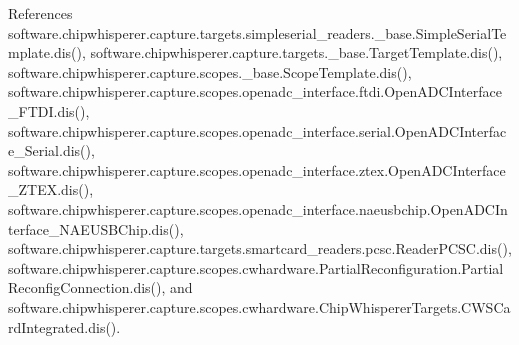 References software.\+chipwhisperer.\+capture.\+targets.\+simpleserial\+\_\+readers.\+\_\+base.\+Simple\+Serial\+Template.\+dis(), software.\+chipwhisperer.\+capture.\+targets.\+\_\+base.\+Target\+Template.\+dis(), software.\+chipwhisperer.\+capture.\+scopes.\+\_\+base.\+Scope\+Template.\+dis(), software.\+chipwhisperer.\+capture.\+scopes.\+openadc\+\_\+interface.\+ftdi.\+Open\+A\+D\+C\+Interface\+\_\+\+F\+T\+D\+I.\+dis(), software.\+chipwhisperer.\+capture.\+scopes.\+openadc\+\_\+interface.\+serial.\+Open\+A\+D\+C\+Interface\+\_\+\+Serial.\+dis(), software.\+chipwhisperer.\+capture.\+scopes.\+openadc\+\_\+interface.\+ztex.\+Open\+A\+D\+C\+Interface\+\_\+\+Z\+T\+E\+X.\+dis(), software.\+chipwhisperer.\+capture.\+scopes.\+openadc\+\_\+interface.\+naeusbchip.\+Open\+A\+D\+C\+Interface\+\_\+\+N\+A\+E\+U\+S\+B\+Chip.\+dis(), software.\+chipwhisperer.\+capture.\+targets.\+smartcard\+\_\+readers.\+pcsc.\+Reader\+P\+C\+S\+C.\+dis(), software.\+chipwhisperer.\+capture.\+scopes.\+cwhardware.\+Partial\+Reconfiguration.\+Partial\+Reconfig\+Connection.\+dis(), and software.\+chipwhisperer.\+capture.\+scopes.\+cwhardware.\+Chip\+Whisperer\+Targets.\+C\+W\+S\+Card\+Integrated.\+dis().



